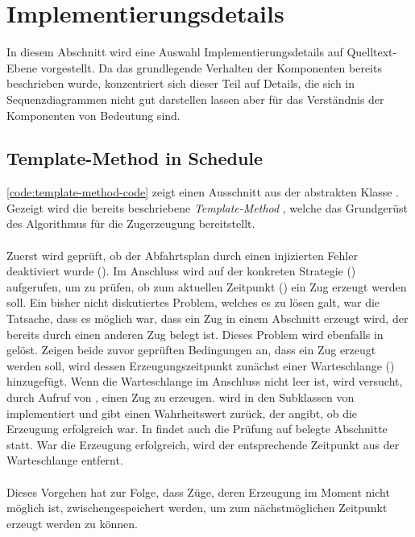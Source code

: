 \section{Implementierungsdetails}

In diesem Abschnitt wird eine Auswahl Implementierungsdetails auf Quelltext-Ebene vorgestellt. Da das grundlegende Verhalten der Komponenten bereits beschrieben wurde, konzentriert sich dieser Teil auf Details, die sich in Sequenzdiagrammen nicht gut darstellen lassen aber für das Verständnis der Komponenten von Bedeutung sind.

\subsection{Template-Method in Schedule}

\autoref{code:template-method-code} zeigt einen Ausschnitt aus der abstrakten Klasse . Gezeigt wird die bereits beschriebene \emph{Template-Method} , welche das Grundgerüst des Algorithmus für die Zugerzeugung bereitstellt.\\
\\
Zuerst wird geprüft, ob der Abfahrtsplan durch einen injizierten Fehler deaktiviert wurde (). Im Anschluss wird  auf der konkreten Strategie () aufgerufen, um zu prüfen, ob zum aktuellen Zeitpunkt () ein Zug erzeugt werden soll. Ein bisher nicht diskutiertes Problem, welches es zu lösen galt, war die Tatsache, dass es möglich war, dass ein Zug in einem Abschnitt erzeugt wird, der bereits durch einen anderen Zug belegt ist. Dieses Problem wird ebenfalls in  gelöst. Zeigen beide zuvor geprüften Bedingungen an, dass ein Zug erzeugt werden soll, wird dessen Erzeugungszeitpunkt zunächst einer Warteschlange () hinzugefügt. Wenn die Warteschlange im Anschluss nicht leer ist, wird versucht, durch Aufruf von , einen Zug zu erzeugen.  wird in den Subklassen von  implementiert und gibt einen Wahrheitswert zurück, der angibt, ob die Erzeugung erfolgreich war. In  findet auch die Prüfung auf belegte Abschnitte statt. War die Erzeugung erfolgreich, wird der entsprechende Zeitpunkt aus der Warteschlange entfernt.\\
\\
Dieses Vorgehen hat zur Folge, dass Züge, deren Erzeugung im Moment nicht möglich ist, zwischengespeichert werden, um zum nächstmöglichen Zeitpunkt erzeugt werden zu können.

